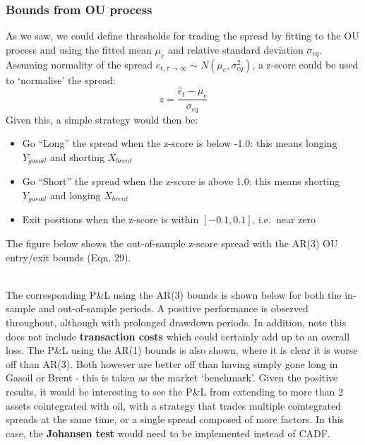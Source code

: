 \documentclass[11pt]{article}
\begin{document}
    \subsubsection{Bounds from OU process}\label{bounds-from-ou-process}
As we saw, we could define thresholds for trading the spread by fitting
to the OU process and using the fitted mean \(\mu_e\) and relative
standard deviation \(\sigma_{eq}\). Assuming normality of the spread
\(e_{t, \tau \to \infty} \sim N (\mu_e, \sigma^2_{eq})\), a z-score
could be used to `normalise' the spread:
\begin{equation}
z = \frac{\hat{e}_t - \mu_e}{\sigma_{eq}}
\end{equation}
Given this, a simple strategy would then be:
\begin{itemize}
\item
  Go ``Long'' the spread when the z-score is below -1.0: this means
  longing \(Y_{gasoil}\) and shorting \(X_{brent}\)
\item
  Go ``Short'' the spread when the z-score is above 1.0: this means
  shorting \(Y_{gasoil}\) and longing \(X_{brent}\)
\item
  Exit positions when the z-score is within \([-0.1, 0.1]\), i.e.~near
  zero
\end{itemize}
The figure below shows the out-of-sample z-score spread with the AR(3)
OU entry/exit bounds (Eqn. 29).
    \begin{center}
    \end{center}
    { \hspace*{\fill} \\}
    The corresponding P\&L using the AR(3) bounds is shown below for both
the in-sample and out-of-sample periods. A positive performance is
observed throughout, although with prolonged drawdown periods. In
addition, note this does not include \textbf{transaction costs} which
could certainly add up to an overall loss. The P\&L using the AR(1)
bounds is also shown, where it is clear it is worse off than AR(3). Both
however are better off than having simply gone long in Gasoil or Brent -
this is taken as the market `benchmark'.
Given the positive results, it would be interesting to see the P\&L from
extending to more than 2 assets cointegrated with oil, with a strategy
that trades multiple cointegrated spreads at the same time, or a single
spread composed of more factors. In this case, the \textbf{Johansen
test} would need to be implemented instead of CADF.
    \begin{center}
    \end{center}
    { \hspace*{\fill} \\}
\end{document}
